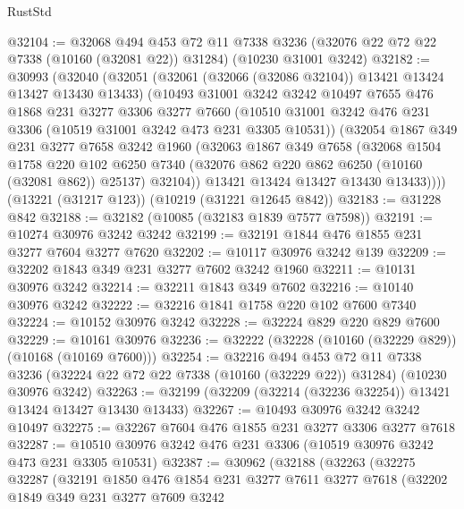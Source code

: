 \begin{lexlean}{RustStd}
\begin{coremodule}
@32104 := @32068
    @494
    @453
    @72
    @11
    @7338
    @3236
    (@32076 @22 @72 @22 @7338 (@10160 (@32081 @22)) @31284)
    (@10230 @31001 @3242)
@32182 := @30993
    (@32040
      (@32051
        (@32061 (@32066 (@32086 @32104)) @13421 @13424 @13427 @13430 @13433)
        (@10493
          @31001
          @3242
          @3242
          @10497
          @7655
          @476
          @1868
          @231
          @3277
          @3306
          @3277
          @7660
          (@10510 @31001 @3242 @476 @231 @3306 (@10519 @31001 @3242 @473 @231 @3305 @10531))
          (@32054
            @1867
            @349
            @231
            @3277
            @7658
            @3242
            @1960
            (@32063
              @1867
              @349
              @7658
              (@32068
                @1504
                @1758
                @220
                @102
                @6250
                @7340
                (@32076 @862 @220 @862 @6250 (@10160 (@32081 @862)) @25137)
                @32104))
            @13421
            @13424
            @13427
            @13430
            @13433))))
    (@13221 (@31217 @123))
    (@10219 (@31221 @12645 @842))
@32183 := @31228 @842
@32188 := @32182 (@10085 (@32183 @1839 @7577 @7598))
@32191 := @10274 @30976 @3242 @3242
@32199 := @32191 @1844 @476 @1855 @231 @3277 @7604 @3277 @7620
@32202 := @10117 @30976 @3242 @139
@32209 := @32202 @1843 @349 @231 @3277 @7602 @3242 @1960
@32211 := @10131 @30976 @3242
@32214 := @32211 @1843 @349 @7602
@32216 := @10140 @30976 @3242
@32222 := @32216 @1841 @1758 @220 @102 @7600 @7340
@32224 := @10152 @30976 @3242
@32228 := @32224 @829 @220 @829 @7600
@32229 := @10161 @30976
@32236 := @32222 (@32228 (@10160 (@32229 @829)) (@10168 (@10169 @7600)))
@32254 := @32216
    @494
    @453
    @72
    @11
    @7338
    @3236
    (@32224 @22 @72 @22 @7338 (@10160 (@32229 @22)) @31284)
    (@10230 @30976 @3242)
@32263 := @32199 (@32209 (@32214 (@32236 @32254)) @13421 @13424 @13427 @13430 @13433)
@32267 := @10493 @30976 @3242 @3242 @10497
@32275 := @32267 @7604 @476 @1855 @231 @3277 @3306 @3277 @7618
@32287 := @10510 @30976 @3242 @476 @231 @3306 (@10519 @30976 @3242 @473 @231 @3305 @10531)
@32387 := @30962
    (@32188
      (@32263
        (@32275
          @32287
          (@32191
            @1850
            @476
            @1854
            @231
            @3277
            @7611
            @3277
            @7618
            (@32202
              @1849
              @349
              @231
              @3277
              @7609
              @3242

\end{coremodule}
\end{lexlean}
